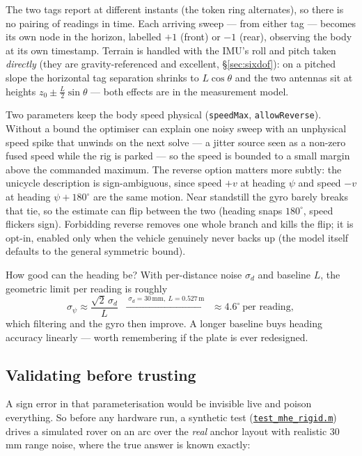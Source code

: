 \documentclass[11pt,a4paper]{article}
\newcommand{\gh}[2]{\href{https://github.com/AdershM-2/UWB_3/blob/main/#1}{\texttt{#2}}}
\newcommand{\code}[1]{\texttt{#1}}
\begin{document}
The two tags report at different instants (the token ring alternates), so there is
no pairing of readings in time. Each arriving sweep --- from either tag --- becomes
its own node in the horizon, labelled $+1$ (front) or $-1$ (rear), observing the
body at its own timestamp. Terrain is handled with the IMU's roll and pitch taken
\emph{directly} (they are gravity-referenced and excellent, \S\ref{sec:sixdof}):
on a pitched slope the horizontal tag separation shrinks to $L\cos\theta$ and the
two antennas sit at heights $z_0 \pm \tfrac{L}{2}\sin\theta$ --- both effects are
in the measurement model.

Two parameters keep the body speed physical (\code{speedMax},
\code{allowReverse}). Without a bound the optimiser can explain one noisy sweep with
an unphysical speed spike that unwinds on the next solve --- a jitter source seen as
a non-zero fused speed while the rig is parked --- so the speed is bounded to a small
margin above the commanded maximum. The reverse option matters more subtly: the
unicycle description is sign-ambiguous, since speed $+v$ at heading $\psi$ and speed
$-v$ at heading $\psi+180^\circ$ are the same motion. Near standstill the gyro barely
breaks that tie, so the estimate can flip between the two (heading snaps
$180^\circ$, speed flickers sign). Forbidding reverse removes one whole branch and
kills the flip; it is opt-in, enabled only when the vehicle genuinely never backs up
(the model itself defaults to the general symmetric bound).

How good can the heading be? With per-distance noise $\sigma_d$ and baseline $L$,
the geometric limit per reading is roughly
\begin{equation}
\sigma_\psi \approx \frac{\sqrt{2}\,\sigma_d}{L}
\;\;\xrightarrow{\;\sigma_d = 30\,\text{mm},\ L = 0.527\,\text{m}\;}\;
\approx 4.6^\circ\ \text{per reading},
\end{equation}
which filtering and the gyro then improve. A longer baseline buys heading accuracy
linearly --- worth remembering if the plate is ever redesigned.

\subsection{Validating before trusting}
\label{sec:rigidvalid}

A sign error in that parameterisation would be invisible live and poison
everything. So before any hardware run, a synthetic test
(\gh{matlab/scripts/test\_mhe\_rigid.m}{test\_mhe\_rigid.m}) drives a simulated
rover on an arc over the \emph{real} anchor layout with realistic 30\,mm range
noise, where the true answer is known exactly:
\end{document}
